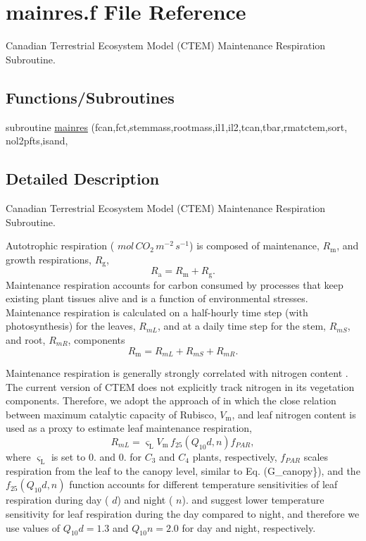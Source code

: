 \hypertarget{mainres_8f}{}\section{mainres.\+f File Reference}
\label{mainres_8f}


Canadian Terrestrial Ecosystem Model (C\+T\+E\+M) Maintenance Respiration Subroutine.  


\subsection*{Functions/\+Subroutines}
\begin{DoxyCompactItemize}
\item 
subroutine \hyperlink{mainres_8f_ac938116d4fe4ed360f4fb9fc8ab39db3}{mainres} (fcan,fct,stemmass,rootmass,il1,il2,tcan,tbar,rmatctem,sort, nol2pfts,isand,
\end{DoxyCompactItemize}


\subsection{Detailed Description}
Canadian Terrestrial Ecosystem Model (C\+T\+E\+M) Maintenance Respiration Subroutine. 

Autotrophic respiration ( $mol\,CO_2\,m^{-2}\,s^{-1}$) is composed of maintenance, $R_\mathrm{m}$, and growth respirations, $R_\mathrm{g}$, \[ R_\mathrm{a} =R_\mathrm{m} + R_\mathrm{g}. \] Maintenance respiration accounts for carbon consumed by processes that keep existing plant tissues alive and is a function of environmental stresses. Maintenance respiration is calculated on a half-\/hourly time step (with photosynthesis) for the leaves, $R_{mL}$, and at a daily time step for the stem, $R_{mS}$, and root, $R_{mR}$, components \[ \label{mainres_all} R_\mathrm{m} = R_{mL} + R_{mS} + R_{mR}. \]

Maintenance respiration is generally strongly correlated with nitrogen content \cite{Reich1998-zr} \cite{Ryan1991-ai}. The current version of C\+T\+E\+M does not explicitly track nitrogen in its vegetation components. Therefore, we adopt the approach of \cite{Collatz1991-5bc} \cite{Collatz1992-jf} in which the close relation between maximum catalytic capacity of Rubisco, $V_\mathrm{m}$, and leaf nitrogen content is used as a proxy to estimate leaf maintenance respiration, \[ R_{mL} = \varsigma_\mathrm{L}V_\mathrm{m}\,f_{25}(Q_10d,n)f_{PAR}, \] where $\varsigma_\mathrm{L}$ is set to 0. and 0. for $C_3$ and $C_4$ plants, respectively, $f_{PAR}$ scales respiration from the leaf to the canopy level, similar to Eq. (G\+\_\+canopy\}), and the $f_{25}(Q_10d,n)$ function accounts for different temperature sensitivities of leaf respiration during day ( $d$) and night ( $n$). \cite{Pons2003-f26} and \cite{Xu2003-d75} suggest lower temperature sensitivity for leaf respiration during the day compared to night, and therefore we use values of $Q_10d=1.3$ and $Q_10n=2.0$ for day and night, respectively.

